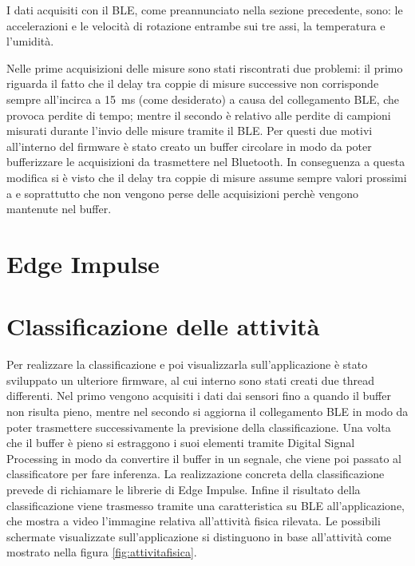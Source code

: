I dati acquisiti con il BLE, come preannunciato nella sezione precedente, sono: le accelerazioni e le velocità di rotazione entrambe sui tre assi, la temperatura e l'umidità. 

Nelle prime acquisizioni delle misure sono stati riscontrati due problemi: il primo riguarda il fatto che il delay tra coppie di misure successive non corrisponde sempre all'incirca a \SI{15}{\milli\second} (come desiderato) a causa del collegamento BLE, che provoca perdite di tempo; mentre il secondo è relativo alle perdite di campioni  misurati durante l'invio delle misure tramite il BLE. Per questi due motivi all'interno del firmware è stato creato un buffer circolare in modo da poter bufferizzare le acquisizioni da trasmettere nel Bluetooth. In conseguenza a questa modifica si è visto che il delay tra coppie di misure assume sempre valori prossimi a %
e soprattutto che non vengono perse delle acquisizioni perchè vengono mantenute nel buffer.



\section{Edge Impulse}

\section{Classificazione delle attività}
Per realizzare la classificazione e poi visualizzarla sull'applicazione è stato sviluppato un ulteriore firmware, al cui interno sono stati creati due thread differenti. Nel primo vengono acquisiti i dati dai sensori fino a quando il buffer non risulta pieno, mentre nel secondo si aggiorna il collegamento BLE in modo da poter trasmettere successivamente la previsione della classificazione. Una volta che il buffer è pieno si estraggono i suoi elementi tramite Digital Signal Processing in modo da convertire il buffer in un segnale, che viene poi passato al classificatore per fare inferenza. La realizzazione concreta della classificazione prevede di richiamare le librerie di Edge Impulse. Infine il risultato della classificazione viene trasmesso tramite una caratteristica su BLE all'applicazione, che mostra a video l'immagine relativa all'attività fisica rilevata. Le possibili schermate visualizzate sull'applicazione si distinguono in base all'attività come mostrato nella figura \ref{fig:attivitafisica}.

